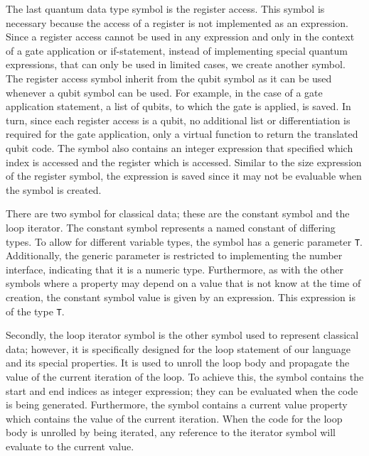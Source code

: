 The last quantum data type symbol is the register access. This symbol is necessary because the access of a register is not implemented as an expression. Since a register access cannot be used in any expression and only in the context of a gate application or if-statement, instead of implementing special quantum expressions, that can only be used in limited cases, we create another symbol. The register access symbol inherit from the qubit symbol as it can be used whenever a qubit symbol can be used. For example, in the case of a gate application statement, a list of qubits, to which the gate is applied, is saved. In turn, since each register access is a qubit, no additional list or differentiation is required for the gate application, only a virtual function to return the translated qubit code. The symbol also contains an integer expression that specified which index is accessed and the register which is accessed. Similar to the size expression of the register symbol, the expression is saved since it may not be evaluable when the symbol is created.

There are two symbol for classical data; these are the constant symbol and the loop iterator. The constant symbol represents a named constant of differing types. To allow for different variable types, the symbol has a generic parameter \texttt{T}. Additionally, the generic parameter is restricted to implementing the number interface, indicating that it is a numeric type. Furthermore, as with the other symbols where a property may depend on a value that is not know at the time of creation, the constant symbol value is given by an expression. This expression is of the type \texttt{T}.

Secondly, the loop iterator symbol is the other symbol used to represent classical data; however, it is specifically designed for the loop statement of our language and its special properties. It is used to unroll the loop body and propagate the value of the current iteration of the loop. To achieve this, the symbol contains the start and end indices as integer expression; they can be evaluated when the code is being generated. Furthermore, the symbol contains a current value property which contains the value of the current iteration. When the code for the loop body is unrolled by being iterated, any reference to the iterator symbol will evaluate to the current value.  

